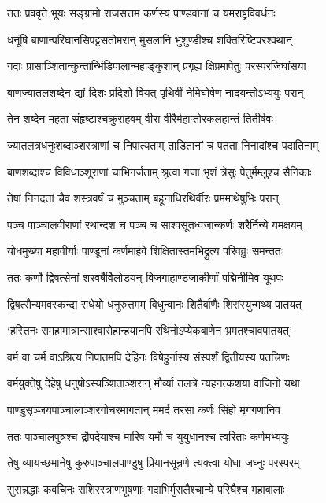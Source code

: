 \twolineshloka
{ततः प्रववृते भूयः सङ्ग्रामो राजसत्तम}
{कर्णस्य पाण्डवानां च यमराष्ट्रविवर्धनः}


\twolineshloka
{धनूंषि बाणान्परिघानसिपट्टसतोमरान्}
{मुसलानि भुशुण्डीश्च शक्तिरिष्टिपरश्वथान्}


\twolineshloka
{गदाः प्रासाञ्शितान्कुन्तान्भिंडिपालान्महाङ्कुशान्}
{प्रगृह्य क्षिप्रमापेतुः परस्परजिघांसया}


\twolineshloka
{बाणज्यातलशब्देन द्यां दिशः प्रदिशो वियत्}
{पृथिवीं नेमिघोषेण नादयन्तोऽभ्ययुः परान्}


\twolineshloka
{तेन शब्देन महता संहृष्टाश्चक्रुराहवम्}
{वीरा वीरैर्महाप्तोरकलहान्तं तितीर्षवः}


\twolineshloka
{ज्यातलत्रधनुःशब्दाञ्शस्त्राणां च निपात्यताम्}
{ताडितानां च पतता निनादांश्च पदातिनाम्}


\twolineshloka
{बाणशब्दांश्च विविधाञ्शूराणां चाभिगर्जताम्}
{श्रुत्वा गजा भृशं त्रेसुः पेतुर्मम्लुश्च सैनिकाः}


\twolineshloka
{तेषां निनदतां चैव शस्त्रवर्षं च मुञ्चताम्}
{बहूनाधिरथिर्वीरः प्रममाथेषुभिः परान्}


\twolineshloka
{पञ्च पाञ्चालवीराणां रथान्दश च पञ्च च}
{साश्वसूतध्वजान्कर्णः शरैर्निन्ये यमक्षयम्}


\twolineshloka
{योधमुख्या महावीर्याः पाण्डूनां कर्णमाहवे}
{शिक्षितास्तमभिद्रुत्य परिवव्रुः समन्ततः}


\twolineshloka
{ततः कर्णो द्विषत्सेनां शरवर्षैर्विलोडयन्}
{विजगाहाण्डजाकीर्णां पद्मिनीमिव यूथपः}


\twolineshloka
{द्विषत्सैन्यमवस्कन्द्य राधेयो धनुरुत्तमम्}
{विधुन्वानः शितैर्बाणैः शिरांस्युन्मथ्य पातयत्}


\twolineshloka
{`हस्तिनः समहामात्रान्साश्वारोहान्हयानपि}
{रथिनोऽप्येकबाणेन भ्रमतश्चावपातयत्'}


\twolineshloka
{वर्म वा चर्म वाऽश्रित्य निपातमपि देहिनः}
{विषेहुर्नास्य संस्पर्शं द्वितीयस्य पतत्त्रिणः}


\twolineshloka
{वर्मयुक्तेषु देहेषु धनुषोऽस्यञ्शिताञ्शरान्}
{मौर्व्या तलत्रे न्यहनत्कशया वाजिनो यथा}


\twolineshloka
{पाण्डुसृञ्जयपाञ्चालाञ्शरगोचरमागतान्}
{ममर्द तरसा कर्णः सिंहो मृगगणानिव}


\twolineshloka
{ततः पाञ्चालपुत्रश्च द्रौपदेयाश्च मारिष}
{यमौ च युयुधानश्च त्वरिताः कर्णमभ्ययुः}


\twolineshloka
{तेषु व्यायच्छमानेषु कुरुपाञ्चालपाण्डुषु}
{प्रियानसून्रणे त्यक्त्वा योधा जघ्नुः परस्परम्}


\twolineshloka
{सुसन्नद्धाः कवचिनः सशिरस्त्राणभूषणाः}
{गदाभिर्मुसलैश्चान्ये परिघैश्च महाबालाः}


